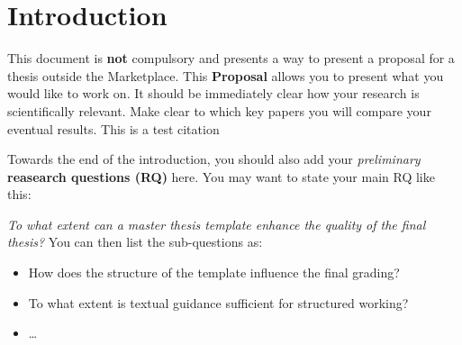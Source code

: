 \section{Introduction}
\label{sec:introduction}
This document is \textbf{not} compulsory and presents a way to present a proposal for a thesis outside the Marketplace. This \textbf{Proposal} allows you to present what you would like to work on. It should be immediately clear how your research is scientifically relevant. Make clear to which key papers you will compare your eventual results. 
 This is a test citation \cite{Gruber1995} 

Towards the end of the introduction, you should also add your \textit{preliminary} \textbf{reasearch questions (RQ)} here. You may want to state your main RQ like this:

\noindent\textit{To what extent can a master thesis template enhance the quality of the final thesis?}
You can then list the sub-questions as:
\begin{itemize}
    \item How does the structure of the template influence the final grading?
    \item To what extent is textual guidance sufficient for structured working?
    \item \dots
\end{itemize}